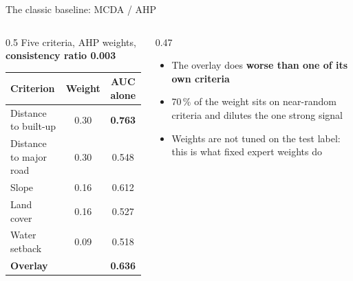 \documentclass[aspectratio=169,11pt]{beamer}
\newcommand{\hl}[1]{\alert{\textbf{#1}}}
\begin{document}
\begin{frame}{The classic baseline: MCDA / AHP}
  \small
  \begin{columns}[T]
    \begin{column}{0.5\textwidth}
      Five criteria, AHP weights, \hl{consistency ratio 0.003}
      \vspace{0.3em}

      \begin{tabular}{@{}lcc@{}}
        \toprule
        Criterion & Weight & AUC alone \\
        \midrule
        Distance to built-up & 0.30 & \textbf{0.763} \\
        Distance to major road & 0.30 & 0.548 \\
        Slope & 0.16 & 0.612 \\
        Land cover & 0.16 & 0.527 \\
        Water setback & 0.09 & 0.518 \\
        \midrule
        \textbf{Overlay} & & \textbf{0.636} \\
        \bottomrule
      \end{tabular}
    \end{column}
    \begin{column}{0.47\textwidth}
      \begin{itemize}
        \item The overlay does \hl{worse than one of its own criteria}
        \item 70\,\% of the weight sits on near-random criteria and dilutes the one strong signal
        \item Weights are not tuned on the test label: this is what fixed expert weights do
      \end{itemize}
    \end{column}
  \end{columns}
\end{frame}
\end{document}
